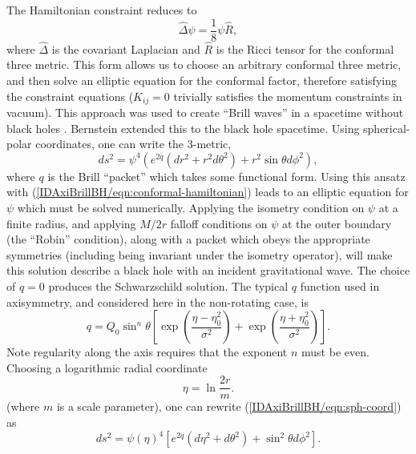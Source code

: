 \documentclass{article}
\begin{document}
The Hamiltonian constraint reduces to
\begin{equation}
\hat \Delta \psi = \frac{1}{8}\psi \hat R,
				\label{IDAxiBrillBH/eqn:conformal-hamiltonian}
\end{equation}
where $\hat \Delta$ is the covariant Laplacian and $\hat R$ is the
Ricci tensor for the conformal three metric. This form allows
us to choose an arbitrary conformal three metric, and then solve an
elliptic equation for the conformal factor, therefore satisfying the
constraint equations ($K_{ij} = 0$ trivially satisfies the momentum
constraints in vacuum).  This approach was used to create
``Brill waves'' in a spacetime without black holes \cite{Brill59}.
Bernstein extended this to the black hole spacetime.  Using
spherical-polar coordinates, one can write the 3-metric,
\begin{equation}
				\label{IDAxiBrillBH/eqn:sph-coord}
ds^2 = \psi^4 (e^{2q} (dr^2 + r^2 d \theta^2) + r^2 \sin \theta d
\phi^2),
\end{equation}
where $q$ is the Brill ``packet'' which takes some functional form.
Using this ansatz with (\ref{IDAxiBrillBH/eqn:conformal-hamiltonian})
leads to an elliptic equation for $\psi$ which must be solved
numerically. Applying the isometry condition on $\psi$ at a finite
radius, and applying $M/2r$ falloff conditions on $\psi$ at the
outer boundary (the ``Robin'' condition), along with a packet which
obeys the appropriate symmetries (including being invariant under the
isometry operator), will make this solution describe a black hole with
an incident gravitational wave.  The choice of $q=0$ produces the
Schwarzschild solution.   The typical $q$ function used in
axisymmetry, and considered here in the non-rotating case, is 
\begin{equation}
				\label{IDAxiBrillBH/eqn:Q}
q = Q_0 \sin^n \theta \left [ \exp\left(\frac{\eta -
      \eta_0^2}{\sigma^2}\right ) + \exp\left(\frac{\eta +
      \eta_0^2}{\sigma^2}\right ) \right ].
\end{equation}
Note regularity along the axis requires that the exponent $n$ must be
even.  Choosing a logarithmic radial coordinate
\begin{equation}
				\label{IDAxiBrillBH/eta-coord}
\eta = \ln{\frac{2r}{m}}.
\end{equation}
(where $m$ is a scale parameter), one can rewrite
(\ref{IDAxiBrillBH/eqn:sph-coord}) as
\begin{equation}
ds^2 = \psi(\eta)^4 [ e^{2 q} (d \eta^2 +  d\theta^2) +  \sin^2
\theta d\phi^2].
\end{equation}
\end{document}
